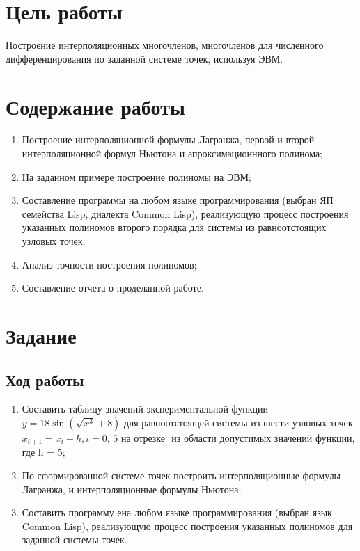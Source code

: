 \section{Цель работы}
Построение интерполяционных многочленов, многочленов для численного дифференцирования по заданной системе точек, используя ЭВМ.

\section{Содержание работы}
\begin{enumerate}
	\item Построение интерполяционной формулы Лагранжа, первой и второй интерполяционной формул Ньютона и апроксимационнного полинома;
	\item На заданном примере построение полиномы на ЭВМ;
	\item Составление программы на любом языке программирования (выбран ЯП семейства Lisp, диалекта Common Lisp), реализующую процесс построения указанных полиномов второго порядка для системы из \underline{равноотстоящих} узловых точек;
	\item Анализ точности построения полиномов;
	\item Составление отчета о проделанной работе.
\end{enumerate}

\section{Задание}
\subsection{Ход работы}
\begin{enumerate}
	\item Составить таблицу значений экспериментальной функции \( y = 18\sin(\sqrt{x^3} + 8) \) для равноотстоящей системы из шести узловых точек \(x_{i+1} = x_i + h, i = \overline{0,\,5}\) на отрезке \(\) из области допустимых значений функции, где h = 5;
	\item По сформированной системе точек построить интерполяционные формулы Лагранжа,  и  интерполяционные формулы Ньютона;
	\item Составить программу ена любом языке программирования (выбран язык Common Lisp), реализующую процесс построения указанных полиномов для заданной системы точек.
\end{enumerate}

